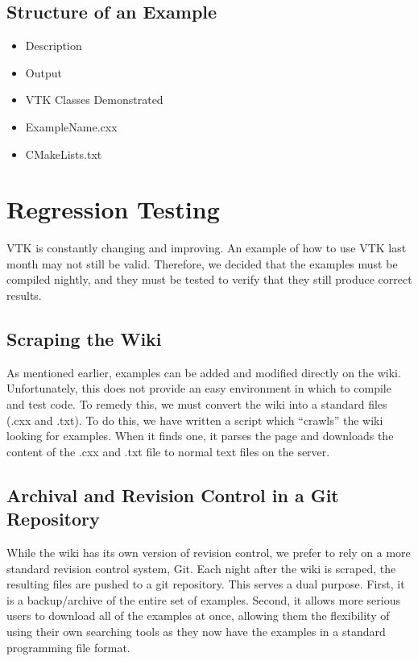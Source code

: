 \documentclass[a4paper,10pt]{IEEEtran}
\begin{document}
\subsection{Structure of an Example}
\begin{itemize}
 \item Description
 \item Output
 \item VTK Classes Demonstrated
 \item ExampleName.cxx
 \item CMakeLists.txt
\end{itemize}


\section{Regression Testing}
VTK is constantly changing and improving. An example of how to use VTK last month may not still be valid. Therefore, we decided that the examples must be compiled nightly, and they must be tested to verify that they still produce correct results.

\subsection{Scraping the Wiki}
As mentioned earlier, examples can be added and modified directly on the wiki. Unfortunately, this does not provide an easy environment in which to compile and test code. To remedy this, we must convert the wiki into a standard files (.cxx and .txt). To do this, we have written a script which ``crawls'' the wiki looking for examples. When it finds one, it parses the page and downloads the content of the .cxx and .txt file to normal text files on the server.

\subsection{Archival and Revision Control in a Git Repository}
While the wiki has its own version of revision control, we prefer to rely on a more standard revision control system, Git. Each night after the wiki is scraped, the resulting files are pushed to a git repository. This serves a dual purpose. First, it is a backup/archive of the entire set of examples. Second, it allows more serious users to download all of the examples at once, allowing them the flexibility of using their own searching tools as they now have the examples in a standard programming file format.
\end{document}

